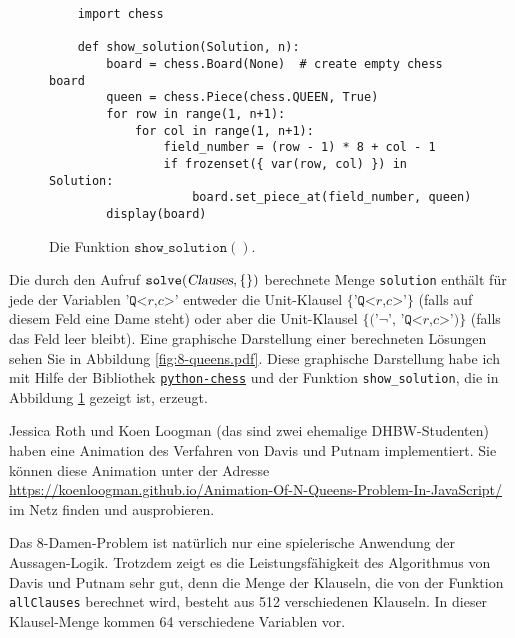\begin{figure}[!ht]
\centering
\begin{verbatim}
    import chess
                
    def show_solution(Solution, n):
        board = chess.Board(None)  # create empty chess board
        queen = chess.Piece(chess.QUEEN, True)
        for row in range(1, n+1):
            for col in range(1, n+1):
                field_number = (row - 1) * 8 + col - 1
                if frozenset({ var(row, col) }) in Solution:
                    board.set_piece_at(field_number, queen)
        display(board)        
\end{verbatim}
\vspace*{-0.3cm}
\caption{Die Funktion $\texttt{show\_solution}()$.}
\label{fig:printBoard}
\end{figure}



Die durch den Aufruf $\texttt{solve}(\textsl{Clauses}, \{\})$ 
berechnete Menge \texttt{solution} enthält für jede der Variablen $\texttt{'Q<}r\texttt{,}c\texttt{>'}$
entweder die Unit-Klausel $\{\texttt{'Q<}r\texttt{,}c\texttt{>'}\}$  (falls auf diesem Feld eine Dame steht) oder
aber die Unit-Klausel  $\{ \texttt{('¬', 'Q<}r\texttt{,}c\texttt{>')}\}$ (falls das Feld leer bleibt).
Eine graphische Darstellung einer berechneten Lösungen sehen Sie in Abbildung \ref{fig:8-queens.pdf}.
Diese graphische Darstellung habe ich mit Hilfe der Bibliothek
\href{https://python-chess.readthedocs.io/en/latest/}{\texttt{python-chess}} und der Funktion
\texttt{show\_solution}, die in Abbildung \ref{fig:printBoard} gezeigt ist, erzeugt.

Jessica Roth und Koen Loogman (das sind zwei ehemalige DHBW-Studenten) haben eine Animation des Verfahren von
Davis und Putnam implementiert.  Sie können diese Animation unter der Adresse
\\[0.2cm]
\hspace*{1.3cm}
\href{https://koenloogman.github.io/Animation-Of-N-Queens-Problem-In-JavaScript/}{https://koenloogman.github.io/Animation-Of-N-Queens-Problem-In-JavaScript/}
\\[0.2cm]
im Netz finden und ausprobieren.

Das 8-Damen-Problem ist natürlich nur eine spielerische Anwendung der Aussagen-Logik.
Trotzdem zeigt es die Leistungsfähigkeit des Algorithmus von Davis
und Putnam sehr gut, denn die Menge der Klauseln, die von der Funktion \texttt{allClauses}
berechnet wird, besteht aus 512 verschiedenen Klauseln.  In dieser Klausel-Menge kommen 64 verschiedene
Variablen vor. 

